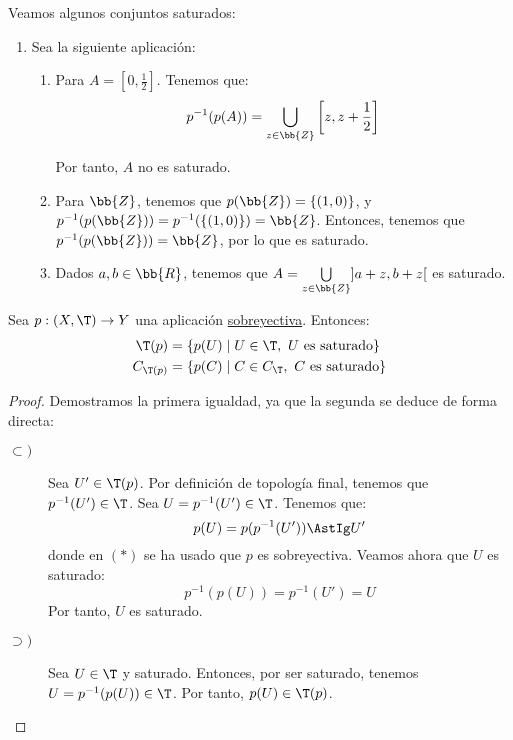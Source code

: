 \begin{ejemplo} Veamos algunos conjuntos saturados:
    \begin{enumerate}
        \item Sea la siguiente aplicación:

        \begin{enumerate}
            \item Para $A=\left[0,\frac{1}{2}\right]$. Tenemos que:
            \begin{equation*}
                p^{-1}(p(A)) = \bigcup_{z\in \bb{Z}}\left[z,z+\frac{1}{2}\right]
            \end{equation*}
    
            Por tanto, $A$ no es saturado.
    
            \item Para $\bb{Z}$, tenemos que $p(\bb{Z})=\{(1,0)\}$, y $p^{-1}(p(\bb{Z}))=p^{-1}(\{(1,0)\})=\bb{Z}$. Entonces, tenemos que $p^{-1}(p(\bb{Z}))=\bb{Z}$, por lo que es saturado.

            \item Dados $a,b\in \bb{R}$, tenemos que $A=\bigcup\limits_{z\in \bb{Z}}]a+z, b+z[$ es saturado.
        \end{enumerate}
    \end{enumerate}
\end{ejemplo}


\begin{prop}
    Sea $p:(X,\T)\to Y$ una aplicación \ul{sobreyectiva}. Entonces:
    \begin{equation*}
        \begin{split}
            \T(p) &= \{p(U)\mid U\in \T,~ U\text{ es saturado}\}\\
        C_{\T(p)} &= \{p(C)\mid C\in C_{\T},~ C\text{ es saturado}\}
        \end{split}
    \end{equation*}
\end{prop}
\begin{proof}
    Demostramos la primera igualdad, ya que la segunda se deduce de forma directa:
    \begin{description}
        \item[$\subset)$] Sea $U'\in \T(p)$. Por definición de topología final, tenemos que $p^{-1}(U')\in \T$. Sea $U=p^{-1}(U')\in \T$. Tenemos que:
        \begin{equation*}
            p(U)=p(p^{-1}(U'))\AstIg U'
        \end{equation*}
        donde en $(\ast)$ se ha usado que $p$ es sobreyectiva. Veamos ahora que $U$ es saturado:
        \begin{equation*}
            p^{-1}(p(U)) = p^{-1}(U') = U
        \end{equation*}
        Por tanto, $U$ es saturado.

        \item[$\supset)$] Sea $U\in \T$ y saturado. Entonces, por ser saturado, tenemos $U=p^{-1}(p(U))\in \T$. Por tanto, $p(U)\in \T(p)$.
    \end{description}
\end{proof}



